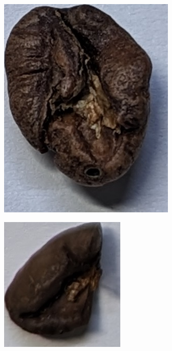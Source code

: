 \begin{figure}
	\begin{subfigure}
		{0.3\textwidth}
		\includegraphics[height=0.8\linewidth, keepaspectratio]{
			./figures/methodology/insect-damaged-bean
		}
		 \label{fig:insectBeanSingle}
	\end{subfigure}
	\begin{subfigure}
		{0.3\textwidth}
		\includegraphics[height=0.8\linewidth, keepaspectratio]{
			./figures/methodology/bean-fragment
		}
		 \label{fig:fragBeanSingle}
	\end{subfigure}
	\begin{subfigure}

\end{subfigure}
\end{figure}
